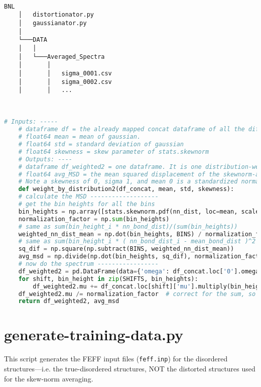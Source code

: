 \begin{minipage}{\linewidth}
~ \\
\begin{Verbatim}[samepage=true]
    BNL
    │   distortionator.py
    │   gaussianator.py   
    │
    └───DATA
    │   │ 
    │   └───Averaged_Spectra
    │       │       
    │       │   sigma_0001.csv
    │       │   sigma_0002.csv
    │       │   ...      
\end{Verbatim}
~
\end{minipage}

\pagebreak
\begin{lstlisting}[language=Python]
    # Inputs: -----
    # dataframe df = the already mapped concat dataframe of all the different delta_rho shifted feff xanes
    # float64 mean = mean of gaussian.
    # float64 std = standard deviation of gaussian
    # float64 skewness = skew parameter of stats.skewnorm
    # Outputs: ----
    # dataframe df_weighted2 = one dataframe. It is one distribution-weighted spectra with cols=['omega','mu']
    # float64 avg_MSD = the mean squared displacement of the skewnorm-averaged spectrum
    # Note a skewness of 0, sigma 1, and mean 0 is a standardized normal distribution.
    def weight_by_distribution2(df_concat, mean, std, skewness):
    # calculate the MSD -------------------
    # get the bin heights for all the bins
    bin_heights = np.array([stats.skewnorm.pdf(nn_dist, loc=mean, scale=std, a=skewness) for nn_dist in BINS])
    normalization_factor = np.sum(bin_heights)
    # same as sum(bin_height_i * nn_bond_dist)/(sum(bin_heights))
    weighted_nn_dist_mean = np.dot(bin_heights, BINS) / normalization_factor
    # same as sum(bin_height_i * ( nn_bond_dist_i - mean_bond_dist )^2 )/sum(bin_heights)
    sq_dif = np.square(np.subtract(BINS, weighted_nn_dist_mean))
    avg_msd = np.divide(np.dot(bin_heights, sq_dif), normalization_factor)
    # now do the spectrum -----------------
    df_weighted2 = pd.DataFrame(data={'omega': df_concat.loc['0'].omega, 'mu': np.zeros(df_concat.loc['0'].omega.shape[0])})
    for shift, bin_height in zip(SHIFTS, bin_heights):
        df_weighted2.mu += df_concat.loc[shift]['mu'].multiply(bin_height)
    df_weighted2.mu /= normalization_factor  # correct for the sum, so the area under the PDF=1
    return df_weighted2, avg_msd
\end{lstlisting}

\pagebreak
\section{generate-training-data.py} \label{app:gen-train-data}
This script generates the FEFF input files (\texttt{feff.inp}) for the disordered structures---i.e. the true-disordered structures, NOT the distorted structures used for the skew-norm averaging.

